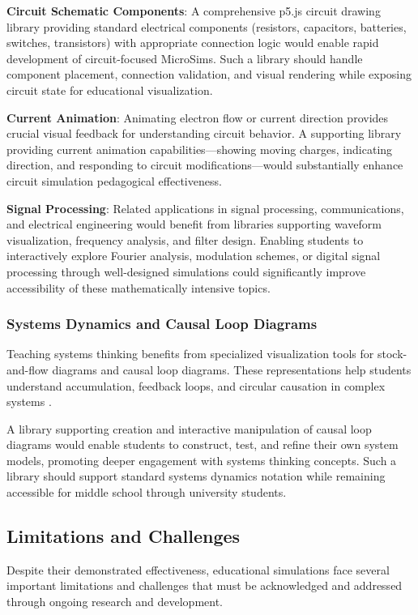\textbf{Circuit Schematic Components}: A comprehensive p5.js circuit drawing library providing standard electrical components (resistors, capacitors, batteries, switches, transistors) with appropriate connection logic would enable rapid development of circuit-focused MicroSims. Such a library should handle component placement, connection validation, and visual rendering while exposing circuit state for educational visualization.

\textbf{Current Animation}: Animating electron flow or current direction provides crucial visual feedback for understanding circuit behavior. A supporting library providing current animation capabilities---showing moving charges, indicating direction, and responding to circuit modifications---would substantially enhance circuit simulation pedagogical effectiveness.

\textbf{Signal Processing}: Related applications in signal processing, communications, and electrical engineering would benefit from libraries supporting waveform visualization, frequency analysis, and filter design. Enabling students to interactively explore Fourier analysis, modulation schemes, or digital signal processing through well-designed simulations could significantly improve accessibility of these mathematically intensive topics.

\subsubsection{Systems Dynamics and Causal Loop Diagrams}

Teaching systems thinking benefits from specialized visualization tools for stock-and-flow diagrams and causal loop diagrams. These representations help students understand accumulation, feedback loops, and circular causation in complex systems \cite{eric2009}.

A library supporting creation and interactive manipulation of causal loop diagrams would enable students to construct, test, and refine their own system models, promoting deeper engagement with systems thinking concepts. Such a library should support standard systems dynamics notation while remaining accessible for middle school through university students.

\subsection{Limitations and Challenges}

Despite their demonstrated effectiveness, educational simulations face several important limitations and challenges that must be acknowledged and addressed through ongoing research and development.

